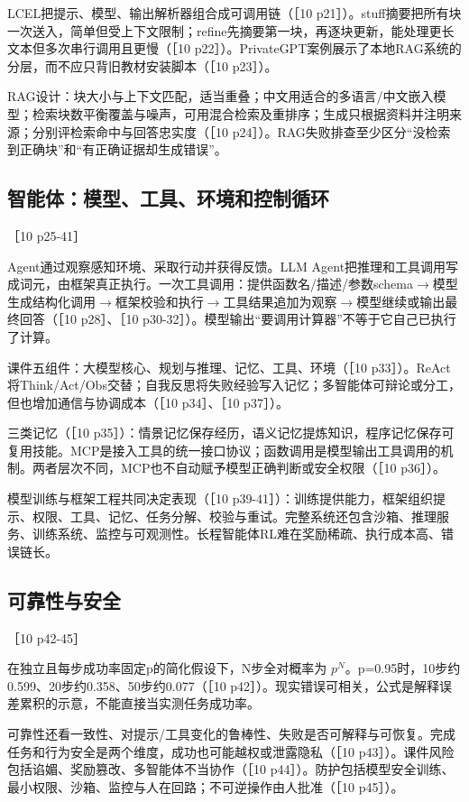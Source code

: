 \documentclass[UTF8,a4paper,zihao=-4,fontset=windows]{ctexart}
\newcommand{\source}[1]{{\small #1}\par}
\begin{document}
LCEL把提示、模型、输出解析器组合成可调用链（［10 p21］）。stuff摘要把所有块一次送入，简单但受上下文限制；refine先摘要第一块，再逐块更新，能处理更长文本但多次串行调用且更慢（［10 p22］）。PrivateGPT案例展示了本地RAG系统的分层，而不应只背旧教材安装脚本（［10 p23］）。

RAG设计：块大小与上下文匹配，适当重叠；中文用适合的多语言/\allowbreak{}中文嵌入模型；检索块数平衡覆盖与噪声，可用混合检索及重排序；生成只根据资料并注明来源；分别评检索命中与回答忠实度（［10 p24］）。RAG失败排查至少区分“没检索到正确块”和“有正确证据却生成错误”。

\subsection{智能体：模型、工具、环境和控制循环}
\source{［10 p25-41］}
Agent通过观察感知环境、采取行动并获得反馈。LLM Agent把推理和工具调用写成词元，由框架真正执行。一次工具调用：提供函数名/\allowbreak{}描述/\allowbreak{}参数schema\ensuremath{\rightarrow}模型生成结构化调用\ensuremath{\rightarrow}框架校验和执行\ensuremath{\rightarrow}工具结果追加为观察\ensuremath{\rightarrow}模型继续或输出最终回答（［10 p28］、［10 p30-32］）。模型输出“要调用计算器”不等于它自己已执行了计算。

课件五组件：大模型核心、规划与推理、记忆、工具、环境（［10 p33］）。ReAct将Think/\allowbreak{}Act/\allowbreak{}Obs交替；自我反思将失败经验写入记忆；多智能体可辩论或分工，但也增加通信与协调成本（［10 p34］、［10 p37］）。

三类记忆（［10 p35］）：情景记忆保存经历，语义记忆提炼知识，程序记忆保存可复用技能。MCP是接入工具的统一接口协议；函数调用是模型输出工具调用的机制。两者层次不同，MCP也不自动赋予模型正确判断或安全权限（［10 p36］）。

模型训练与框架工程共同决定表现（［10 p39-41］）：训练提供能力，框架组织提示、权限、工具、记忆、任务分解、校验与重试。完整系统还包含沙箱、推理服务、训练系统、监控与可观测性。长程智能体RL难在奖励稀疏、执行成本高、错误链长。

\subsection{可靠性与安全}
\source{［10 p42-45］}
在独立且每步成功率固定p的简化假设下，N步全对概率为 $p^N$。p=0.95时，10步约0.599、20步约0.358、50步约0.077（［10 p42］）。现实错误可相关，公式是解释误差累积的示意，不能直接当实测任务成功率。

可靠性还看一致性、对提示/\allowbreak{}工具变化的鲁棒性、失败是否可解释与可恢复。完成任务和行为安全是两个维度，成功也可能越权或泄露隐私（［10 p43］）。课件风险包括谄媚、奖励篡改、多智能体不当协作（［10 p44］）。防护包括模型安全训练、最小权限、沙箱、监控与人在回路；不可逆操作由人批准（［10 p45］）。
\end{document}
